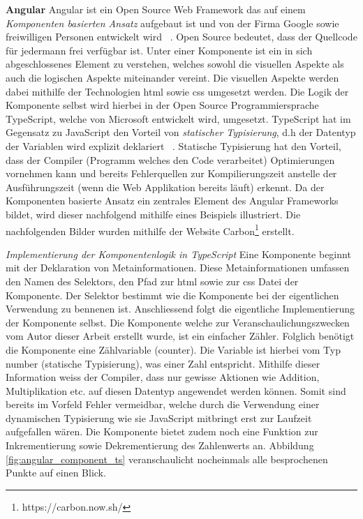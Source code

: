 \noindent
\textbf{Angular}
\newline
\indent
Angular ist ein Open Source Web Framework das auf einem \textit{Komponenten basierten Ansatz} aufgebaut ist und von der Firma Google sowie freiwilligen Personen entwickelt wird ~\citep{what_is_angular}. Open Source bedeutet, dass der Quellcode für jedermann frei verfügbar ist. Unter einer Komponente ist ein in sich abgeschlossenes Element zu verstehen, welches sowohl die visuellen Aspekte als auch die logischen Aspekte miteinander vereint. Die visuellen Aspekte werden dabei mithilfe der Technologien \gls{html} sowie \gls{css} umgesetzt werden. Die Logik der Komponente selbst wird hierbei in der Open Source Programmiersprache TypeScript, welche von Microsoft entwickelt wird, umgesetzt. TypeScript hat im Gegensatz zu JavaScript den Vorteil von \textit{statischer Typisierung}, d.h der Datentyp der Variablen wird explizit deklariert ~\citep{typescript}. Statische Typisierung hat den Vorteil, dass der Compiler (Programm welches den Code verarbeitet) Optimierungen vornehmen kann und bereits Fehlerquellen zur Kompilierungszeit anstelle der Ausführungszeit (wenn die Web Applikation bereits läuft) erkennt. Da der Komponenten basierte Ansatz ein zentrales Element des Angular Frameworks bildet, wird dieser nachfolgend mithilfe eines Beispiels illustriert. Die nachfolgenden Bilder wurden mithilfe der Website Carbon\footnote{https://carbon.now.sh/} erstellt.

\clearpage
\noindent
\textit{Implementierung der Komponentenlogik in TypeScript}
\newline
\indent
Eine Komponente beginnt mit der Deklaration von Metainformationen. Diese Metainformationen umfassen den Namen des Selektors, den Pfad zur \gls{html} sowie zur \gls{css} Datei der Komponente. Der Selektor bestimmt wie die Komponente bei der eigentlichen Verwendung zu bennenen ist. Anschliessend folgt die eigentliche Implementierung der Komponente selbst. Die Komponente welche zur Veranschaulichungszwecken vom Autor dieser Arbeit erstellt wurde, ist ein einfacher Zähler. Folglich benötigt die Komponente eine Zählvariable (counter). Die Variable ist hierbei vom Typ number (statische Typisierung), was einer Zahl entspricht. Mithilfe dieser Information weiss der Compiler, dass nur gewisse Aktionen wie Addition, Multiplikation etc. auf diesen Datentyp angewendet werden können. Somit sind bereits im Vorfeld Fehler vermeidbar, welche durch die Verwendung einer dynamischen Typisierung wie sie JavaScript mitbringt erst zur Laufzeit aufgefallen wären. Die Komponente bietet zudem noch eine Funktion zur Inkrementierung sowie Dekrementierung des Zahlenwerts an. Abbildung \ref{fig:angular_component_ts} veranschaulicht nocheinmals alle besprochenen Punkte auf einen Blick.

